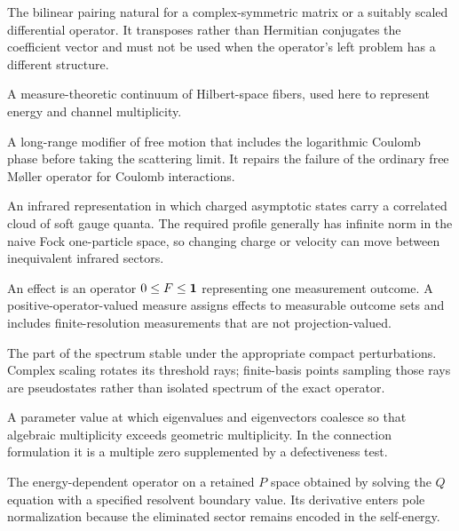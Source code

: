 \begin{description}[style=nextline]
  \item[$c$ product.]
  The bilinear pairing natural for a complex-symmetric matrix or a suitably
  scaled differential operator.  It transposes rather than Hermitian
  conjugates the coefficient vector and must not be used when the operator's
  left problem has a different structure.

  \item[Direct integral.] A measure-theoretic continuum of Hilbert-space
  fibers, used here to represent energy and channel multiplicity.

  \item[Dollard comparison dynamics.]
  A long-range modifier of free motion that includes the logarithmic Coulomb
  phase before taking the scattering limit.  It repairs the failure of the
  ordinary free M{\o}ller operator for Coulomb interactions.

  \item[Dressing sector.]
  An infrared representation in which charged asymptotic states carry a
  correlated cloud of soft gauge quanta.  The required profile generally has
  infinite norm in the naive Fock one-particle space, so changing charge or
  velocity can move between inequivalent infrared sectors.

  \item[Effect and POVM.]
  An effect is an operator $0\le F\le\mathbf{1}$ representing one measurement
  outcome.  A positive-operator-valued measure assigns effects to measurable
  outcome sets and includes finite-resolution measurements that are not
  projection-valued.

  \item[Essential spectrum.]
  The part of the spectrum stable under the appropriate compact
  perturbations.  Complex scaling rotates its threshold rays; finite-basis
  points sampling those rays are pseudostates rather than isolated spectrum
  of the exact operator.

  \item[Exceptional point (EP).]
  A parameter value at which eigenvalues and eigenvectors coalesce so that
  algebraic multiplicity exceeds geometric multiplicity.  In the connection
  formulation it is a multiple zero supplemented by a defectiveness test.

  \item[Feshbach operator.]
  The energy-dependent operator on a retained $P$ space obtained by solving
  the $Q$ equation with a specified resolvent boundary value.  Its derivative
  enters pole normalization because the eliminated sector remains encoded in
  the self-energy.


\end{description}
